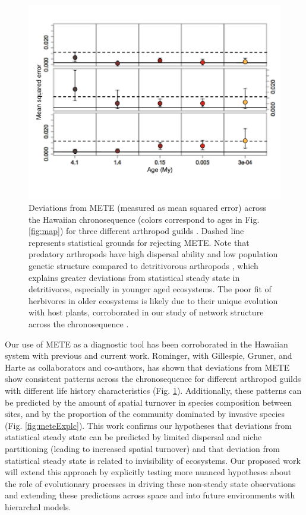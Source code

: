 \documentclass[11pt]{article}
\begin{document}
\begin{figure}[!htb]
  \centering
  \includegraphics[scale=0.4]{../figs/fig_meteAll.pdf}
  \caption{Deviations from METE (measured as mean squared error)
    across the Hawaiian chronosequence (colors correspond to ages in
    Fig. \ref{fig:map}) for three different arthropod guilds
    \citep[data from][]{gruner2007}.  Dashed line represents
    statistical grounds for rejecting METE. Note that predatory
    arthropods have high dispersal ability and low population genetic
    structure compared to detritivorous arthropods
    \citep{rominger2015}, which explains greater deviations from
    statistical steady state in detritivores, especially in younger
    aged ecosystems.  The poor fit of herbivores in older ecosystems
    is likely due to their unique evolution with host plants,
    corroborated in our study of network structure across the
    chronosequence \citep{rominger2015}.}
  \label{fig:meteAll}
\end{figure}

Our use of METE as a diagnostic tool has been corroborated in the
Hawaiian system with previous and current work.  Rominger, with
Gillespie, Gruner, and Harte as collaborators and co-authors, has
shown that deviations from METE show consistent patterns across the
chronosequence for different arthropod guilds with different life
history characteristics (Fig. \ref{fig:meteAll}).  Additionally, these
patterns can be predicted by the amount of spatial turnover in species
composition between sites, and by the proportion of the community
dominated by invasive species (Fig. \ref{fig:meteExplc}). This work
confirms our hypotheses that deviations from statistical steady state
can be predicted by limited dispersal and niche partitioning (leading
to increased spatial turnover) and that deviation from statistical
steady state is related to invisibility of ecosystems.  Our proposed
work will extend this approach by explicitly testing more nuanced
hypotheses about the role of evolutionary processes in driving these
non-steady state observations and extending these predictions across
space and into future environments with hierarchal models.
\end{document}
